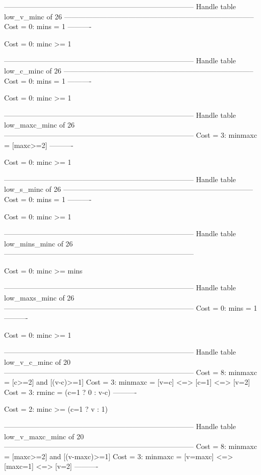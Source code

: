 --------------------------------------------------------------------------------
Handle table low_v_minc of 26
--------------------------------------------------------------------------------
Cost =  0:  mins = 1
----------

Cost =  0:  minc >= 1

--------------------------------------------------------------------------------
Handle table low_c_minc of 26
--------------------------------------------------------------------------------
Cost =  0:  mins = 1
----------

Cost =  0:  minc >= 1

--------------------------------------------------------------------------------
Handle table low_maxc_minc of 26
--------------------------------------------------------------------------------
Cost =  3:  minmaxc = [maxc>=2]
----------

Cost =  0:  minc >= 1

--------------------------------------------------------------------------------
Handle table low_s_minc of 26
--------------------------------------------------------------------------------
Cost =  0:  mins = 1
----------

Cost =  0:  minc >= 1

--------------------------------------------------------------------------------
Handle table low_mins_minc of 26
--------------------------------------------------------------------------------

Cost =  0:  minc >= mins

--------------------------------------------------------------------------------
Handle table low_maxs_minc of 26
--------------------------------------------------------------------------------
Cost =  0:  mins = 1
----------

Cost =  0:  minc >= 1

--------------------------------------------------------------------------------
Handle table low_v_c_minc of 20
--------------------------------------------------------------------------------
Cost =  8:  minmaxc = [c>=2] and [(v-c)>=1]
Cost =  3:  minmaxc = [v=c] <=> [c=1] <=> [v=2]
Cost =  3:  rminc   = (c=1 ? 0 : v-c)
----------

Cost =  2:  minc >= (c=1 ? v : 1)

--------------------------------------------------------------------------------
Handle table low_v_maxc_minc of 20
--------------------------------------------------------------------------------
Cost =  8:  minmaxc = [maxc>=2] and [(v-maxc)>=1]
Cost =  3:  minmaxc = [v=maxc] <=> [maxc=1] <=> [v=2]
----------

